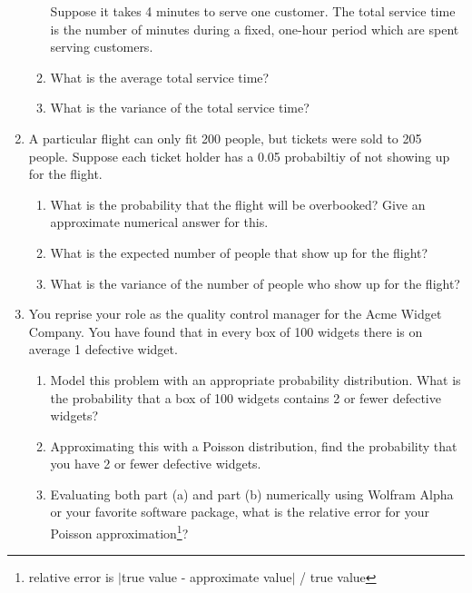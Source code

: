 \documentclass[12pt]{article}
\begin{document}
\begin{enumerate}
\begin{enumerate}
Suppose it takes 4 minutes to serve one customer. The total service time is the number of minutes during a fixed, one-hour period which are spent serving customers.
\item What is the average total service time?
\item What is the variance of the total service time?
\end{enumerate}

\item A particular flight can only fit 200 people, but tickets were sold to 205 people. Suppose each ticket holder has a 0.05 probabiltiy of not showing up for the flight.
\begin{enumerate}
\item What is the probability that the flight will be overbooked? Give an approximate numerical answer for this.
\item What is the expected number of people that show up for the flight?
\item What is the variance of the number of people who show up for the flight?
\end{enumerate}

\item You reprise your role as the quality control manager for the Acme Widget Company. You have found that in every box of 100 widgets there is on average 1 defective widget.
\begin{enumerate}
\item Model this problem with an appropriate probability distribution. What is the probability that a box of 100 widgets contains 2 or fewer defective widgets?
\item Approximating this with a Poisson distribution, find the probability that you have 2 or fewer defective widgets.
\item Evaluating both part (a) and part (b) numerically using Wolfram Alpha or your favorite software package, what is the relative error for your Poisson approximation\footnote{relative error is $|$true value - approximate value$|$ / true value}?
\end{enumerate}

\end{enumerate}
\end{document}
